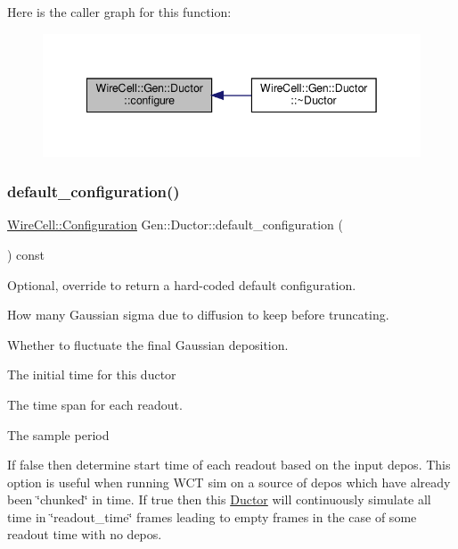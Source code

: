 Here is the caller graph for this function\+:
\nopagebreak
\begin{figure}[H]
\begin{center}
\leavevmode
\includegraphics[width=342pt]{class_wire_cell_1_1_gen_1_1_ductor_a2e5f7a0246fe8918d7b241a8be8e1917_icgraph}
\end{center}
\end{figure}
\mbox{\label{class_wire_cell_1_1_gen_1_1_ductor_ab9486eb33932f6f7c0ff321675829178}} 
\subsubsection{\texorpdfstring{default\+\_\+configuration()}{default\_configuration()}}
{\footnotesize\ttfamily \hyperlink{namespace_wire_cell_a9f705541fc1d46c608b3d32c182333ee}{Wire\+Cell\+::\+Configuration} Gen\+::\+Ductor\+::default\+\_\+configuration (\begin{DoxyParamCaption}{ }\end{DoxyParamCaption}) const\hspace{0.3cm}{\ttfamily [virtual]}}



Optional, override to return a hard-\/coded default configuration. 

How many Gaussian sigma due to diffusion to keep before truncating.

Whether to fluctuate the final Gaussian deposition.

The initial time for this ductor

The time span for each readout.

The sample period

If false then determine start time of each readout based on the input depos. This option is useful when running W\+CT sim on a source of depos which have already been \char`\"{}chunked\char`\"{} in time. If true then this \hyperlink{class_wire_cell_1_1_gen_1_1_ductor}{Ductor} will continuously simulate all time in \char`\"{}readout\+\_\+time\char`\"{} frames leading to empty frames in the case of some readout time with no depos.

